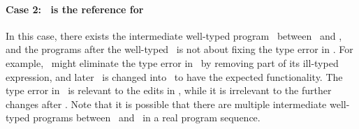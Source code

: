 \documentclass[12pt]{report}	%
\begin{document}
\paragraph{Case 2: \pgk\ is the reference for \pgi}
In this case, there exists the intermediate well-typed program \pgj\ 
between \pgi\ and \pgk, 
and the programs after the well-typed \pgk\ is not about fixing the type error in \pgi.
%
For example, \pgj\ might eliminate the type error
in \pgi\ by removing part of its ill-typed expression, and later
\pgj\ is changed into \pgk\ to have the expected functionality.
The type error in \pgi\ is relevant to the edits in \pgk,
while it is irrelevant to the further changes after \pgk.
Note that it is possible that there are multiple
intermediate well-typed programs
between \pgi\ and \pgk\ in a real program sequence.
\end{document}
